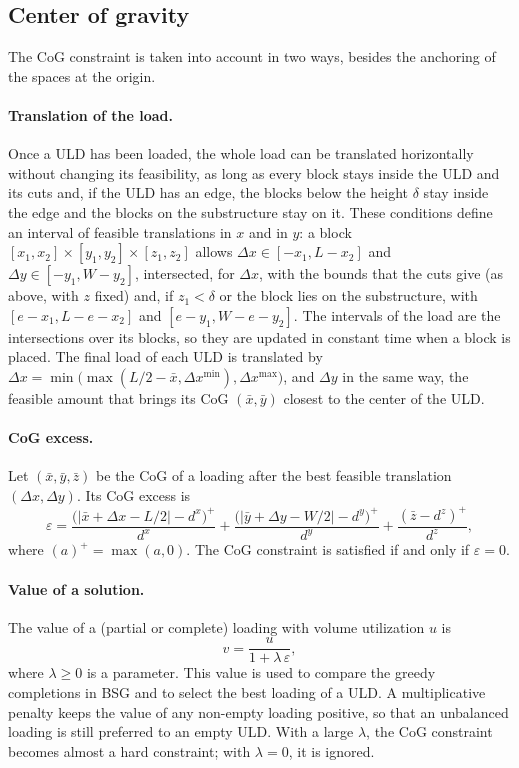 \subsection{Center of gravity}
\label{sec:alg-cog}

The CoG constraint is taken into account in two ways, besides the anchoring of the spaces at
the origin.

\paragraph{Translation of the load.}
Once a ULD has been loaded, the whole load can be translated horizontally without changing its
feasibility, as long as every block stays inside the ULD and its cuts and, if the ULD has an
edge, the blocks below the height $\delta$ stay inside the edge and the blocks on the
substructure stay on it. These conditions define an interval of feasible translations in $x$
and in $y$: a block $[x_1, x_2] \times [y_1, y_2] \times [z_1, z_2]$ allows
$\Delta x \in [-x_1, L - x_2]$ and $\Delta y \in [-y_1, W - y_2]$, intersected, for $\Delta x$, with
the bounds that the cuts give (as above, with $z$ fixed) and, if $z_1 < \delta$ or the block lies
on the substructure, with $[e - x_1, L - e - x_2]$ and $[e - y_1, W - e - y_2]$. The intervals of
the load are the intersections over its blocks, so they are updated in constant time when a
block is placed. The final load of each ULD is translated by
$\Delta x = \min\bigl(\max(L/2 - \bar x, \Delta x^{\min}), \Delta x^{\max}\bigr)$, and $\Delta y$ in the
same way, the feasible amount that brings its CoG $(\bar x, \bar y)$ closest to the center of
the ULD.

\paragraph{CoG excess.}
Let $(\bar x, \bar y, \bar z)$ be the CoG of a loading after the best feasible translation
$(\Delta x, \Delta y)$. Its CoG excess is
\begin{equation}
\label{eq:excess}
\varepsilon = \frac{\bigl(|\bar x + \Delta x - L/2| - d^x\bigr)^+}{d^x}
	+ \frac{\bigl(|\bar y + \Delta y - W/2| - d^y\bigr)^+}{d^y}
	+ \frac{(\bar z - d^z)^+}{d^z},
\end{equation}
where $(a)^+ = \max(a, 0)$. The CoG constraint is satisfied if and only if $\varepsilon = 0$.

\paragraph{Value of a solution.}
The value of a (partial or complete) loading with volume utilization $u$ is
\begin{equation}
\label{eq:value}
v = \frac{u}{1 + \lambda\,\varepsilon},
\end{equation}
where $\lambda \ge 0$ is a parameter. This value is used to compare the greedy completions in
BSG and to select the best loading of a ULD. A multiplicative penalty keeps the value of any
non-empty loading positive, so that an unbalanced loading is still preferred to an empty ULD.
With a large $\lambda$, the CoG constraint becomes almost a hard constraint; with
$\lambda = 0$, it is ignored.


